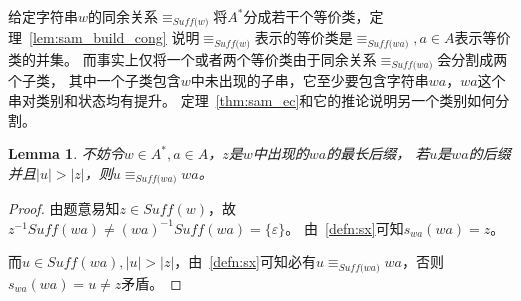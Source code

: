 \documentclass[UTF8]{ctexart}
\newtheorem{lem}[thm]{Lemma}
\theoremstyle{definition}
\theoremstyle{remark}
\numberwithin{equation}{subsection}
\newcommand{\equsuf}[1][x]{\equiv_{\textit{Suff(#1)}}}
\newcommand{\Suff}{\textit{Suff}}
\begin{document}
	给定字符串$w$的同余关系$\equsuf[w]$将$A^*$分成若干个等价类，定理~\ref{lem:sam_build_cong}
	说明$\equsuf[w]$表示的等价类是$\equsuf[wa], a \in A$表示等价类的并集。
	而事实上仅将一个或者两个等价类由于同余关系$\equsuf[wa]$会分割成两个子类，
	其中一个子类包含$w$中未出现的子串，它至少要包含字符串$wa$，$wa$这个串对类别和状态均有提升。
	定理~\ref{thm:sam_ec}和它的推论说明另一个类别如何分割。
	
	\begin{lem}
	\label{lem:longest_suf_equ}
		不妨令$w \in A^*, a \in A$，$z$是$w$中出现的$wa$的最长后缀，
		若$u$是$wa$的后缀并且$|u| > |z|$，则$u \equsuf[wa] wa$。
	\end{lem}
	\begin{proof}
		由题意易知$z \in \Suff(w)$，故$z^{-1} \Suff(wa) \neq (wa)^{-1} \Suff(wa) = \{ \varepsilon \}$。
		由~\ref{defn:sx}可知$s_{wa}(wa) = z$。
		
		而$u \in \Suff(wa), |u| > |z|$，由~\ref{defn:sx}可知必有$u \equsuf[wa] wa$，否则$s_{wa}(wa) = u \neq z$矛盾。
	\end{proof}
	
\end{document}
